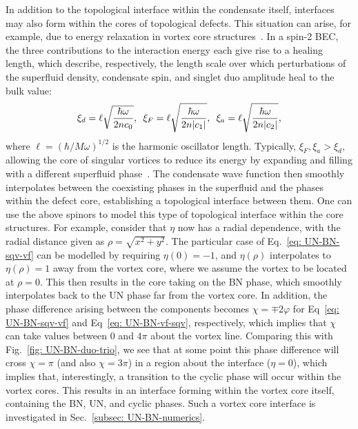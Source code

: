 In addition to the topological interface within the condensate itself,
interfaces may also form within the cores of topological defects.
This situation can arise, for example, due to energy relaxation in vortex core
structures~\cite{Ruostekoski2003,Lovegrove2012,Lovegrove2016,Borgh2016,
    Borgh2016a, Weiss2019,Xiao2021,Xiao2022}.
In a spin-2 BEC, the three contributions to the interaction energy each give
rise to a healing length, which describe, respectively, the length scale over
which perturbations of the superfluid density, condensate spin, and singlet duo
amplitude heal to the bulk value:
\begin{equation}
    \xi_d=\ell \sqrt{\frac{\hbar\omega}{2nc_0}},
    \enskip \xi_F=\ell \sqrt{\frac{\hbar\omega}{2n|c_1|}},
    \enskip \xi_a=\ell \sqrt{\frac{\hbar\omega}{2n|c_2|}},
    \label{eq: spin-2-healing-lengths}
\end{equation}
where \(\ell = {(\hbar/M\omega)}^{1/2}\) is the harmonic oscillator length.
Typically, \(\xi_F,\xi_a > \xi_d\), allowing the core of singular vortices
to reduce its energy by expanding and filling with a different superfluid
phase~\cite{Ruostekoski2003}.
The condensate wave function then smoothly interpolates between the coexisting
phases in the superfluid and the phases within the defect core, establishing a
topological interface between them.
One can use the above spinors to model this type of topological interface within
the core structures.
For example, consider that \(\eta \) now has a radial dependence, with the
radial distance given as \(\rho = \sqrt{x^2 + y^2}\).
The particular case of Eq.~\eqref{eq: UN-BN-sqv-vf} can be modelled by requiring
\(\eta(0) = -1\), and \(\eta(\rho)\) interpolates to \(\eta(\rho) = 1\) away
from the vortex core, where we assume the vortex to be located at \(\rho = 0\).
This then results in the core taking on the BN phase, which smoothly
interpolates back to the UN phase far from the vortex core.
In addition, the phase difference arising between the components becomes
\(\chi = \mp 2\varphi \) for Eq~\eqref{eq: UN-BN-sqv-vf} and
Eq~\eqref{eq: UN-BN-vf-sqv}, respectively, which implies that \(\chi \) can take
values between 0 and \(4\pi \) about the vortex line.
Comparing this with Fig.~\ref{fig: UN-BN-duo-trio}, we see that at some point
this phase difference will cross \(\chi = \pi \) (and also \(\chi=3\pi \)) in a
region about the interface (\(\eta = 0\)), which implies that, interestingly, a
transition to the cyclic phase will occur within the vortex cores.
This results in an interface forming within the vortex core itself, containing
the BN, UN, and cyclic phases.
Such a vortex core interface is investigated in
Sec.~\ref{subsec: UN-BN-numerics}.

